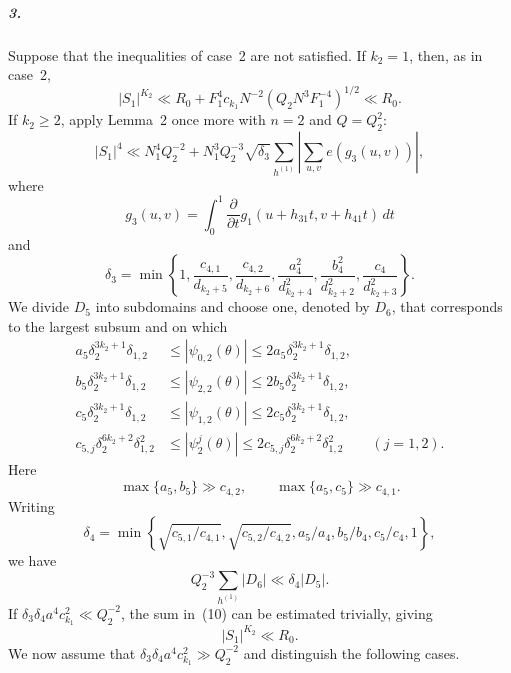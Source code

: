 \documentclass[10pt]{article}
\begin{document}
\subparagraph{3.}
Suppose that the inequalities of case~2 are not satisfied. If $k_2=1$, then, as in case~2,
\[
  |S_1|^{K_2}
  \ll R_0+F_1^4c_{k_1}N^{-2}(Q_2N^3F_1^{-4})^{1/2}
  \ll R_0.
\]
If $k_2\geqslant2$, apply Lemma~2 once more with $n=2$ and $Q=Q_2^2$:
\begin{equation}
  |S_1|^4
  \ll N_1^4Q_2^{-2}
  +N_1^3Q_2^{-3}\sqrt{\delta_3}
   \sum_{h^{(1)}}\left|\sum_{u,v}e(g_3(u,v))\right|,
  \tag{10}
\end{equation}
where
\[
  g_3(u,v)=\int_0^1\frac{\partial}{\partial t}
  g_1(u+h_{31}t,v+h_{41}t)\,dt
\]
and
\[
  \delta_3=\min\left\{
    1,\frac{c_{4,1}}{d_{k_2+5}},\frac{c_{4,2}}{d_{k_2+6}},
    \frac{a_4^2}{d_{k_2+4}^2},\frac{b_4^2}{d_{k_2+2}^2},
    \frac{c_4}{d_{k_2+3}^2}
  \right\}.
\]
We divide $D_5$ into subdomains and choose one, denoted by $D_6$, that corresponds to the largest subsum and on which
\[
\begin{aligned}
  a_5\delta_2^{3k_2+1}\delta_{1,2}
  &\leqslant|\psi_{0,2}(\theta)|
   \leqslant2a_5\delta_2^{3k_2+1}\delta_{1,2},\\
  b_5\delta_2^{3k_2+1}\delta_{1,2}
  &\leqslant|\psi_{2,2}(\theta)|
   \leqslant2b_5\delta_2^{3k_2+1}\delta_{1,2},\\
  c_5\delta_2^{3k_2+1}\delta_{1,2}
  &\leqslant|\psi_{1,2}(\theta)|
   \leqslant2c_5\delta_2^{3k_2+1}\delta_{1,2},\\
  c_{5,j}\delta_2^{6k_2+2}\delta_{1,2}^2
  &\leqslant|\psi_2^j(\theta)|
   \leqslant2c_{5,j}\delta_2^{6k_2+2}\delta_{1,2}^2
  \qquad(j=1,2).
\end{aligned}
\]
Here
\[
  \max\{a_5,b_5\}\gg c_{4,2},
  \qquad \max\{a_5,c_5\}\gg c_{4,1}.
\]
Writing
\[
  \delta_4=\min\left\{
    \sqrt{c_{5,1}/c_{4,1}},\sqrt{c_{5,2}/c_{4,2}},
    a_5/a_4,b_5/b_4,c_5/c_4,1
  \right\},
\]
we have
\[
  Q_2^{-3}\sum_{h^{(1)}}|D_6|\ll\delta_4|D_5|.
\]
If $\delta_3\delta_4a^4c_{k_1}^2\ll Q_2^{-2}$, the sum in~(10) can be estimated trivially, giving
\[
  |S_1|^{K_2}\ll R_0.
\]
We now assume that $\delta_3\delta_4a^4c_{k_1}^2\gg Q_2^{-2}$ and distinguish the following cases.
\end{document}
